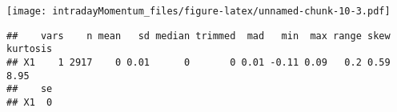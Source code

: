 \documentclass[]{article}
\newenvironment{Shaded}{\begin{snugshade}}{\end{snugshade}}
\newcommand{\KeywordTok}[1]{\textcolor[rgb]{0.13,0.29,0.53}{\textbf{#1}}}
\newcommand{\NormalTok}[1]{#1}
\newcommand{\OperatorTok}[1]{\textcolor[rgb]{0.81,0.36,0.00}{\textbf{#1}}}
\newcommand{\StringTok}[1]{\textcolor[rgb]{0.31,0.60,0.02}{#1}}
\begin{document}
\texttt{[image: intradayMomentum\_files/figure-latex/unnamed-chunk-10-3.pdf]}

\begin{Shaded}
\end{Shaded}

\begin{verbatim}
##    vars    n mean   sd median trimmed  mad   min  max range skew kurtosis
## X1    1 2917    0 0.01      0       0 0.01 -0.11 0.09   0.2 0.59     8.95
##    se
## X1  0
\end{verbatim}
\end{document}
